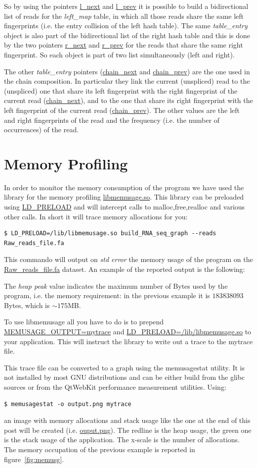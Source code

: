 \documentclass[11pt]{article}
\begin{document}
So by using the pointers \url{l_next} and \url{l_prev} it is possible
to build a bidirectional list of reads for the \emph{left\_map} table,
in which all those reads share the same left fingerprints (i.e. the
entry collision of the left hash table). The same \emph{table\_entry}
object is also part of the bidirectional list of the right hash table
and this is done by the two pointers \url{r_next} and \url{r_prev} for
the reads that share the same right fingerprint. So each object is
part of two list simultaneously (left and right).

The other \emph{table\_entry} pointers (\url{chain_next} and
\url{chain_prev}) are the one used in the chain composition. In
particular they link the current (unspliced) read to the (unspliced)
one that share its left fingerprint with the right fingerprint of the
current read (\url{chain_next}), and to the one that share its right
fingerprint with the left fingerprint of the current read
(\url{chain_prev}). The other values are the left and right
fingerprints of the read and the frequency (i.e. the number of
occurrences) of the read.

\section{Memory Profiling}
In order to monitor the memory consumption of the program we have used
the library for the memory profiling \url{libmemusage.so}. This
library can be preloaded using \url{LD_PRELOAD} and will intercept calls to
malloc,free,realloc and various other calls. In short it will trace
memory allocations for you:
\begin{verbatim}
$ LD_PRELOAD=/lib/libmemusage.so build_RNA_seq_graph --reads Raw_reads_file.fa
\end{verbatim}
This commando will output on \emph{std error} the memory usage of the
program on the \url{Raw_reads_file.fa} dataset. An example of the
reported output is the following: {\small
   } 

The \emph{heap peak} value indicates the maximum number of Bytes used
by the program, i.e. the memory requirement: in the previous example
it is $183838093$ Bytes, which is $\sim175$MB.

To use libmemusage all you have to do is to prepend
\url{MEMUSAGE_OUTPUT=mytrace} and \url{LD_PRELOAD=/lib/libmemusage.so}
to your application. This will instruct the library to write out a
trace to the mytrace file.

This trace file can be converted to a graph using the memusagestat
utility. It is not installed by most GNU distributions and can be
either build from the glibc sources or from the QtWebKit performance
measurement utilities. Using:
\begin{verbatim}
$ memusagestat -o output.png mytrace
\end{verbatim}
an image with memory allocations and stack usage like the one at the
end of this post will be created (i.e. \url{ouput.png}). The redline
is the heap usage, the green one is the stack usage of the
application. The x-scale is the number of allocations. The memory
occupation of the previous example is reported in
figure~\ref{fig:memusg}.
\end{document}
